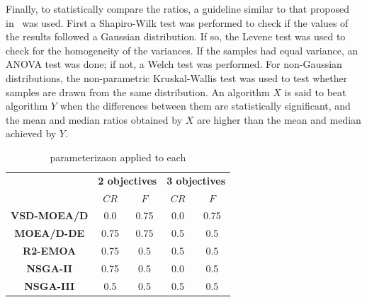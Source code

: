 Finally, to statistically compare the \HV{} ratios, a guideline similar to that proposed in~\cite{durillo2010study} was used.
%
First a Shapiro-Wilk test was performed to check if the values of the results followed a Gaussian distribution.
%
If so, the Levene test was used to check for the homogeneity of the variances.
%
If the samples had equal variance, an ANOVA test was done; if not, a Welch test was performed.
%
For non-Gaussian distributions, the non-parametric Kruskal-Wallis test was used to test whether samples are drawn from the same distribution.
%
An algorithm $X$ is said to beat algorithm $Y$ when the differences between them are statistically significant, and the mean and median \HV{} ratios
obtained by $X$ are higher than the mean and median achieved by $Y$.


\begin{table}[t]
\centering
\caption{\DE{} parameterizaon applied to each \MOEA{}}
\label{tab:tunning}
\begin{tabular}{c|c|c|c|c}
\hline
\multirow{2}{*}{}   & \multicolumn{2}{c|}{\textbf{2 objectives}} & \multicolumn{2}{c}{\textbf{3 objectives}} \\ \cline{2-5} 
                    & $CR$                 & $F$                 & $CR$                 & $F$                 \\ \hline
\textbf{VSD-MOEA/D} & 0.0                  & 0.75                & 0.0                  & 0.75                \\ \hline
\textbf{MOEA/D-DE}  & 0.75                 & 0.75                & 0.5                  & 0.5                 \\ \hline
\textbf{R2-EMOA}    & 0.75                 & 0.5                 & 0.5                  & 0.5                 \\ \hline
\textbf{NSGA-II}    & 0.75                 & 0.5                 & 0.0                  & 0.5                 \\ \hline
\textbf{NSGA-III}   & 0.5                  & 0.5                 & 0.5                  & 0.5                 \\ \hline
\end{tabular}%
\end{table}

